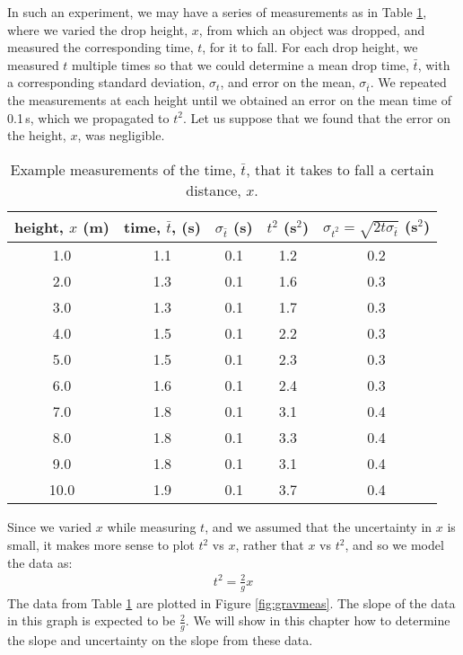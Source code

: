 In such an experiment, we may have a series of measurements as in Table \ref{tab:gravmeas}, where we varied the drop height, $x$, from which an object was dropped, and measured the corresponding time, $t$, for it to fall. For each drop height, we measured $t$ multiple times so that we could determine a mean drop time, $\bar t$, with a corresponding standard deviation, $\sigma_t$, and error on the mean, $\sigma_{\bar t}$. We repeated the measurements at each height until we obtained an error on the mean time of 0.1\,s, which we propagated to $t^2$. Let us suppose that we found that the error on the height, $x$, was negligible. 

\begin{table}[h!]
\center
\begin{tabular}{|c|c|c|c|c|}
\hline
\textbf{height, $x$ (m)}&\textbf{time, $\bar t$, (s)}&\textbf{$\sigma_{\bar t}$ (s)}&\textbf{$t^2$ (s$^2$)}&\textbf{$\sigma_{t^2}=\sqrt{2t\sigma_{\bar t}}$ (s$^2$)}\\
\hline
1.0 & 1.1 & 0.1 & 1.2 & 0.2 \\ 
\hline
2.0 & 1.3 & 0.1 & 1.6 & 0.3 \\ 
\hline
3.0 & 1.3 & 0.1 & 1.7 & 0.3 \\ 
\hline
4.0 & 1.5 & 0.1 & 2.2 & 0.3 \\ 
\hline
5.0 & 1.5 & 0.1 & 2.3 & 0.3 \\ 
\hline
6.0 & 1.6 & 0.1 & 2.4 & 0.3 \\ 
\hline
7.0 & 1.8 & 0.1 & 3.1 & 0.4 \\ 
\hline
8.0 & 1.8 & 0.1 & 3.3 & 0.4 \\ 
\hline
9.0 & 1.8 & 0.1 & 3.1 & 0.4 \\ 
\hline
10.0 & 1.9 & 0.1 & 3.7 & 0.4 \\ 
\hline
\end{tabular}
\caption{\label{tab:gravmeas} Example measurements of the time, $\bar t$, that it takes to fall a certain distance, $x$.}
\end{table}

Since we varied $x$ while measuring $t$, and we assumed that the uncertainty in $x$ is small, it makes more sense to plot $t^2$ vs $x$, rather that $x$ vs $t^2$, and so we model the data as:
\begin{align}
\label{eqn:t2ofx}
t^2 = \frac{2}{g}x
\end{align}
The data from Table \ref{tab:gravmeas} are plotted in Figure \ref{fig:gravmeas}. The slope of the data in this graph is expected to be $\frac{2}{g}$. We will show in this chapter how to determine the slope and uncertainty on the slope from these data. 

